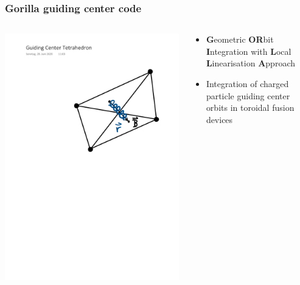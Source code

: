 \documentclass{beamer}
\begin{document}
\begin{frame}
\frametitle{\textbf{Gorilla} guiding center code}
\begin{columns}[onlytextwidth]
	\begin{column}{0.5\textwidth}

		\begin{center}
	\includegraphics[trim={5cm 10cm 1cm 4cm},clip,width=1\textwidth]{FIGURES/guiding_center_drawn2.pdf}
\end{center}
\end{column}
	\begin{column}{0.50\textwidth}
			\begin{center}
	\begin{itemize}
		\item \textbf{G}eometric \textbf{OR}bit \textbf{I}ntegration with \textbf{L}ocal \textbf{L}inearisation \textbf{A}pproach
		\item Integration of charged particle guiding center orbits in toroidal fusion devices
	\end{itemize}
\end{center}
	\end{column}
	\end{columns}
\end{frame}
\end{document}
